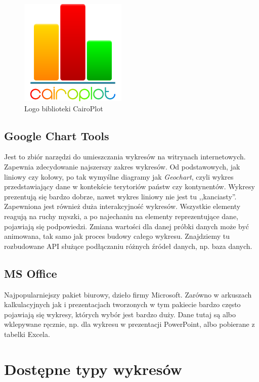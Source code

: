 \documentclass[11pt,twoside,a4paper,final]{llncs}
\begin{document}
\begin{figure}
\centering
\caption{Logo biblioteki CairoPlot}\label{rys:logo:cairo}
\includegraphics[scale=0.6]{cairo_plot.png}
\end{figure}

\subsection{Google Chart Tools}
Jest to zbiór narzędzi do umieszczania wykresów na witrynach internetowych. Zapewnia zdecydowanie najszerszy zakres wykresów. Od podstawowych, jak liniowy czy kołowy, po tak wymyślne diagramy jak \textit{Geochart}, czyli wykres przedstawiający dane w kontekście terytoriów państw czy kontynentów.
Wykresy prezentują się bardzo dobrze, nawet wykres liniowy nie jest tu ,,kanciasty''. Zapewniona jest również duża interakcyjność wykresów. Wszystkie elementy reagują na ruchy myszki, a po najechaniu na elementy reprezentujące dane, pojawiają się podpowiedzi. Zmiana wartości dla danej próbki danych może być animowana, tak samo jak proces budowy całego wykresu. Znajdziemy tu rozbudowane API służące podłączaniu różnych źródeł danych, np. baza danych.

\subsection{MS Office}
Najpopularniejszy pakiet biurowy, dzieło firmy Microsoft. Zarówno w arkuszach kalkulacyjnych jak i prezentacjach tworzonych w tym pakiecie bardzo często pojawiają się wykresy, których wybór jest bardzo duży.
Dane tutaj są albo wklepywane ręcznie, np. dla wykresu w prezentacji PowerPoint, albo pobierane z tabelki Excela. 

\section{Dostępne typy wykresów}
\end{document}
